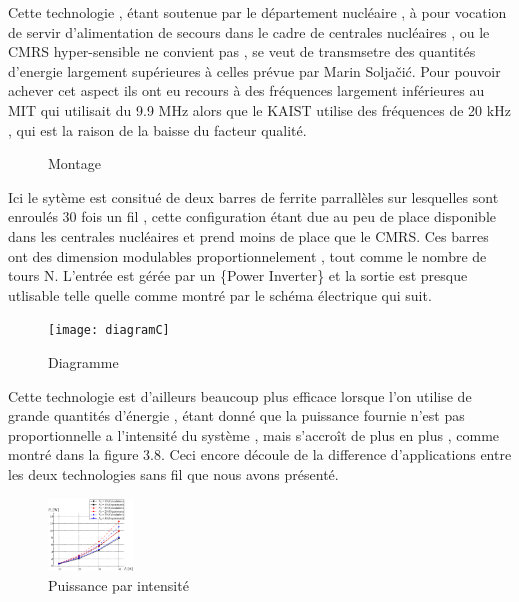 \documentclass[12pt]{report}
\begin{document}
  Cette technologie , étant soutenue par le département nucléaire , à pour vocation de servir d'alimentation de secours dans le cadre de centrales nucléaires , ou le CMRS hyper-sensible ne convient pas , se veut de transmsetre des quantités d'energie largement supérieures à celles prévue par Marin Soljačić. Pour pouvoir achever cet aspect ils ont eu recours à des fréquences largement inférieures au MIT qui utilisait du 9.9 MHz alors que le KAIST utilise des fréquences de 20 kHz , qui est la raison de la baisse du facteur qualité.
  
\begin{figure}
  \begin{center}
    \setlength\fboxsep{0pt}
    \setlength\fboxrule{0.5pt}
  \end{center}
  \caption{Montage}
\end{figure}Ici le sytème est consitué de deux barres de ferrite parrallèles sur lesquelles sont enroulés 30 fois un fil , cette configuration étant due au peu de place disponible dans les centrales nucléaires et prend moins de place que le CMRS. Ces barres ont des dimension modulables proportionnelement , tout comme le nombre de tours N. L'entrée est gérée par un \{Power Inverter\} et la sortie est presque utlisable telle quelle comme montré par le schéma électrique qui suit.
\begin{figure}
  \begin{center}
    \texttt{[image: diagramC]}
  \end{center}
  \caption{Diagramme}
\end{figure}

  Cette technologie est d'ailleurs beaucoup plus efficace lorsque l'on utilise de grande quantités d'énergie , étant donné que la puissance fournie n'est pas proportionnelle a l'intensité du système , mais s'accroît de plus en plus , comme montré dans la figure 3.8. Ceci encore découle de la difference d'applications entre les deux technologies sans fil que nous avons présenté.
\begin{figure}
  \begin{center}
    \includegraphics[width=0.2\textwidth]{PparI}
  \end{center}
  \caption{Puissance par intensité}
\end{figure}
\end{document}
